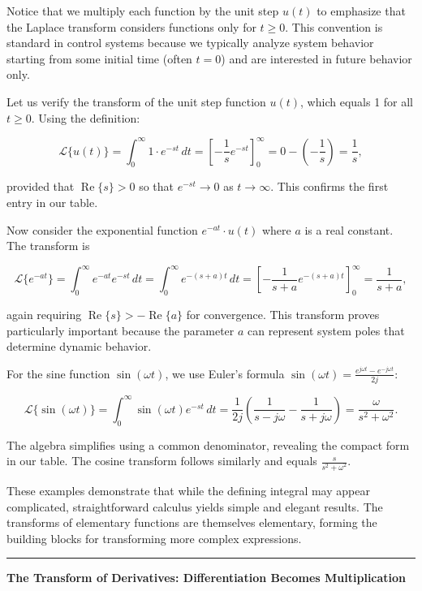Notice that we multiply each function by the unit step $u(t)$ to emphasize that the Laplace transform considers functions only for $t \geq 0$. This convention is standard in control systems because we typically analyze system behavior starting from some initial time (often $t = 0$) and are interested in future behavior only.

\begin{example}
Let us verify the transform of the unit step function $u(t)$, which equals 1 for all $t \geq 0$. Using the definition:

\[
\mathcal{L}\{u(t)\} = \int_0^\infty 1 \cdot e^{-st} \, dt = \left[ -\frac{1}{s} e^{-st} \right]_0^\infty = 0 - \left( -\frac{1}{s} \right) = \frac{1}{s},
\]

provided that $\operatorname{Re}\{s\} > 0$ so that $e^{-st} \to 0$ as $t \to \infty$. This confirms the first entry in our table.

Now consider the exponential function $e^{-at} \cdot u(t)$ where $a$ is a real constant. The transform is

\[
\mathcal{L}\{e^{-at}\} = \int_0^\infty e^{-at} e^{-st} \, dt = \int_0^\infty e^{-(s+a)t} \, dt = \left[ -\frac{1}{s+a} e^{-(s+a)t} \right]_0^\infty = \frac{1}{s+a},
\]

again requiring $\operatorname{Re}\{s\} > -\operatorname{Re}\{a\}$ for convergence. This transform proves particularly important because the parameter $a$ can represent system poles that determine dynamic behavior.

For the sine function $\sin(\omega t)$, we use Euler's formula $\sin(\omega t) = \frac{e^{j\omega t} - e^{-j\omega t}}{2j}$:

\[
\mathcal{L}\{\sin(\omega t)\} = \int_0^\infty \sin(\omega t) e^{-st} \, dt = \frac{1}{2j} \left( \frac{1}{s-j\omega} - \frac{1}{s+j\omega} \right) = \frac{\omega}{s^2 + \omega^2}.
\]

The algebra simplifies using a common denominator, revealing the compact form in our table. The cosine transform follows similarly and equals $\frac{s}{s^2 + \omega^2}$.
\end{example}

These examples demonstrate that while the defining integral may appear complicated, straightforward calculus yields simple and elegant results. The transforms of elementary functions are themselves elementary, forming the building blocks for transforming more complex expressions.

\vspace{1em}
\hrule
\vspace{0.5em}
\color{UofSCGarnet}\textbf{The Transform of Derivatives: Differentiation Becomes Multiplication}\color{UofSCBlack}
\vspace{0.5em}

